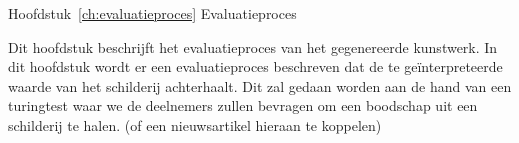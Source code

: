 Hoofdstuk~\ref{ch:evaluatieproces} Evaluatieproces

Dit hoofdstuk beschrijft het evaluatieproces van het gegenereerde kunstwerk. In dit hoofdstuk wordt er een evaluatieproces beschreven dat de te geïnterpreteerde waarde van het schilderij achterhaalt. Dit zal gedaan worden aan de hand van een turingtest waar we de deelnemers zullen bevragen om een boodschap uit een schilderij te halen. (of een nieuwsartikel hieraan te koppelen)



